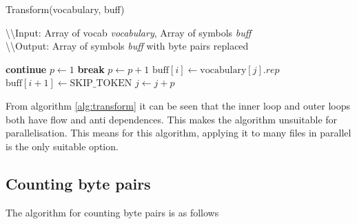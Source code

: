 \documentclass{article}
\begin{document}
\begin{algorithm}[H]
    \caption{Transform(vocabulary, buff)} \label{alg:transform}
    \textbackslash \textbackslash Input: Array of vocab \textit{vocabulary}, Array of symbols \textit{buff} \\
    \textbackslash \textbackslash Output: Array of symbols \textit{buff} with byte pairs replaced
    \begin{algorithmic}[1]
                    \State \textbf{continue}
                \EndIf
                    \State $p \gets 1$
                            \State \textbf{break}
                        \EndIf
                        \State $p \gets p + 1$
                    \EndWhile 
                        \State $\text{buff}[i] \gets \text{vocabulary}[j].rep$
                        \State $\text{buff}[i+1] \gets \text{SKIP\_TOKEN}$
                    \EndIf
                    \State $j \gets j + p$
                \EndIf
            \EndFor
        \EndFor
    \end{algorithmic}    
\end{algorithm}

From algorithm \ref{alg:transform} it can be seen that the inner loop and outer loops both have 
flow and anti dependences. This makes the algorithm unsuitable for parallelisation. This means for this algorithm, applying
it to many files in parallel is the only suitable option.

\newpage
\subsection{Counting byte pairs}

The algorithm for counting byte pairs is as follows
\end{document}
